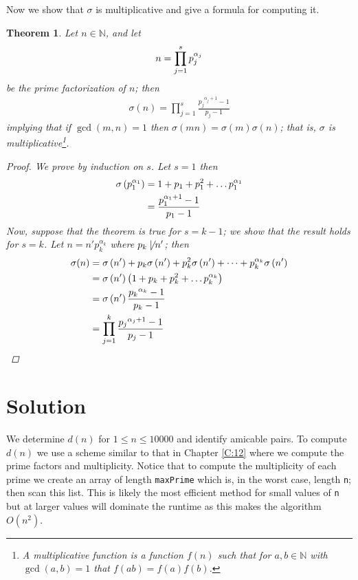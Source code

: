 \documentclass[oneside,12pt]{book}   	%
\newcounter{ex}
\newcounter{pr}
\newtheorem{thm}{Theorem}[chapter]
\theoremstyle{definition}
\newcommand{\paren}[1]{\left( #1 \right)}
\begin{document}
\begin{spacing}{1.618}
		Now we show that $\sigma$ is multiplicative and give a formula for computing it\cite{Andrews1971}. 
		\begin{thm}
			Let $n\in\mathbb{N}$, and let
			\begin{alignat}{4}
				n=\prod_{j=1}^s p_j^{\alpha_j} \notag
			\end{alignat}
			be the prime factorization of $n$; then
			\begin{alignat}{4}
				\sigma(n)=\prod_{j=1}^s \frac{{p_j}^{\alpha_j+1}-1}{p_j-1}
			\end{alignat}
			implying that if $\gcd{(m, n)}=1$ then $\sigma(mn)=\sigma(m)\sigma(n)$; that is, $\sigma$ is multiplicative\footnote{A multiplicative function is a function $f(n)$ such that for $a, b\in\mathbb{N}$ with $\gcd{(a, b)}=1$ that $f(ab)=f(a)f(b)$.}. 
			\begin{proof}
				We prove by induction on $s$. Let $s=1$ then 
				\begin{alignat}{4}
					\sigma\left(p_1^{\alpha_1}\right)&=1+p_1+p_1^2+\dots p_1^{\alpha_1} \notag \\
						&=\frac{p_1^{\alpha_1+1}-1}{p_1-1}
				\end{alignat}
				Now, suppose that the theorem is true for $s=k-1$; we show that the result holds for $s=k$. Let $n=n' p_{k}^{\alpha_{k}}$ where $p_{k}\not\mid n'$; then 
				\begin{alignat}{4}
					\sigma(n)&=\sigma\left(n'\right)+p_{k}\sigma\left(n'\right)+p_{k}^2\sigma\left(n'\right)+\dots+p_{k}^{\alpha_{k}}\sigma\left(n'\right) \notag \\
						&=\sigma\left(n'\right)\left(1+p_{k}+p_{k}^2+\dots p_{k}^{\alpha_{k}}\right) \notag \\
						&=\sigma\left(n'\right) \frac{{p_{k}}^{\alpha_k}-1}{p_k-1} \notag \\
						&=\prod_{j=1}^{k} \frac{{p_j}^{\alpha_j+1}-1}{p_j-1} \notag
				\end{alignat}
			\end{proof}
		\end{thm}
		
		\section{Solution}
		
			We determine $d(n)$ for $1\leq n\leq 10000$ and identify amicable pairs. To compute $d(n)$ we use a scheme similar to that in Chapter \ref{C:12} where we compute the prime factors and multiplicity. Notice that to compute the multiplicity of each prime we create an array of length \texttt{maxPrime} which is, in the worst case, length \texttt{n}; then scan this list. This is likely the most efficient method for small values of \texttt{n} but at larger values will dominate the runtime as this makes the algorithm $O\paren{n^2}$. 
			

\end{spacing}
\end{document}
